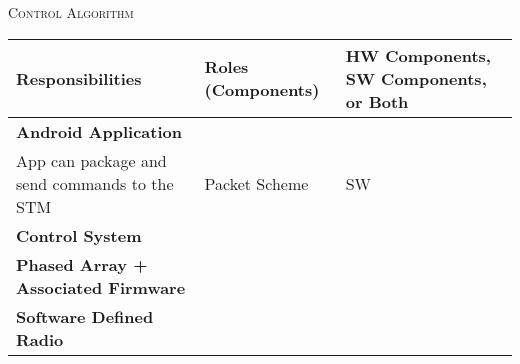 \documentclass[RRC.tex]{subfiles}
\begin{document}
\bigskip

\begin{center}
	\textsc{\Large Control Algorithm}
	\hrulefill
	\begin{tabular}{ | p{5cm} | p{5cm} | p{5cm} |}
		\hline
		Responsibilities & Roles (Components) & HW Components, SW Components, or Both \\ \hline
		\textbf{Android Application} & & \\ \hline
		App can package and send commands to the STM & Packet Scheme & SW  \\ \hline
		\textbf{Control System} & & \\ \hline
		\textbf{Phased Array + Associated Firmware} & & \\ \hline
		\textbf{Software Defined Radio} & & \\ \hline
		
	\end{tabular}
\end{center}
\end{document}
